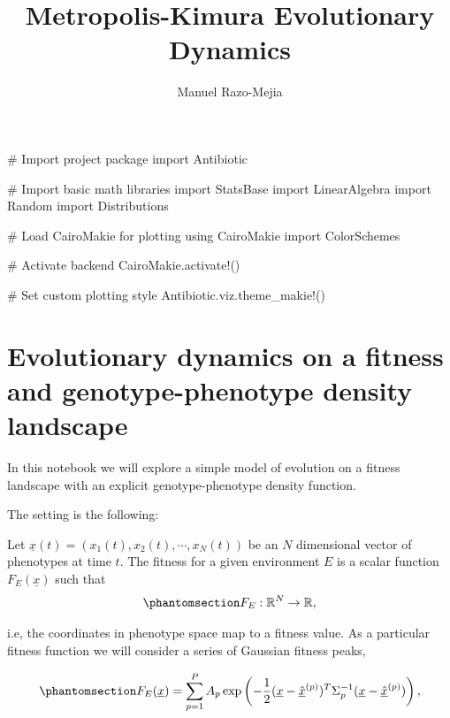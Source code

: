 \documentclass[
]{scrartcl}
\title{Metropolis-Kimura Evolutionary Dynamics}
\author[1]{Manuel Razo-Mejia}
\affil[1]{Department of Biology, Stanford University}
\date{}
\newenvironment{Shaded}{\begin{snugshade}}{\end{snugshade}}
\newcommand{\BuiltInTok}[1]{\textcolor[rgb]{0.00,0.23,0.31}{#1}}
\newcommand{\CommentTok}[1]{\textcolor[rgb]{0.37,0.37,0.37}{#1}}
\newcommand{\FunctionTok}[1]{\textcolor[rgb]{0.28,0.35,0.67}{#1}}
\newcommand{\ImportTok}[1]{\textcolor[rgb]{0.00,0.46,0.62}{#1}}
\newcommand{\NormalTok}[1]{\textcolor[rgb]{0.00,0.23,0.31}{#1}}
\begin{document}
\linenumbers
\maketitle
\begin{Shaded}
\begin{Highlighting}[]
\CommentTok{\# Import project package}
\ImportTok{import} \BuiltInTok{Antibiotic}

\CommentTok{\# Import basic math libraries}
\ImportTok{import} \BuiltInTok{StatsBase}
\ImportTok{import} \BuiltInTok{LinearAlgebra}
\ImportTok{import} \BuiltInTok{Random}
\ImportTok{import} \BuiltInTok{Distributions}

\CommentTok{\# Load CairoMakie for plotting}
\ImportTok{using} \BuiltInTok{CairoMakie}
\ImportTok{import} \BuiltInTok{ColorSchemes}

\CommentTok{\# Activate backend}
\NormalTok{CairoMakie.}\FunctionTok{activate!}\NormalTok{()}

\CommentTok{\# Set custom plotting style}
\NormalTok{Antibiotic.viz.}\FunctionTok{theme\_makie!}\NormalTok{()}
\end{Highlighting}
\end{Shaded}

\section{Evolutionary dynamics on a fitness and genotype-phenotype
density
landscape}\label{evolutionary-dynamics-on-a-fitness-and-genotype-phenotype-density-landscape}

In this notebook we will explore a simple model of evolution on a
fitness landscape with an explicit genotype-phenotype density function.

The setting is the following:

Let \(\underline{x}(t) = (x_1(t), x_2(t), \cdots, x_N(t))\) be an \(N\)
dimensional vector of phenotypes at time \(t\). The fitness for a given
environment \(E\) is a scalar function \(F_E(\underline{x})\) such that
\begin{equation}\phantomsection\label{eq-fitness-landscape}{
F_E: \mathbb{R}^N \to \mathbb{R},
}\end{equation}

i.e, the coordinates in phenotype space map to a fitness value. As a
particular fitness function we will consider a series of Gaussian
fitness peaks,

\begin{equation}\phantomsection\label{eq-fitness-landscape-gaussian}{
F_E(\underline{x}) = 
\sum_{p=1}^P A_p 
\exp\left(
    -\frac{1}{2}
    (\underline{x} - \underline{\hat{x}}^{(p)})^T 
    \Sigma_p^{-1} 
    (\underline{x} - \underline{\hat{x}}^{(p)})
\right),
}\end{equation}
\end{document}
